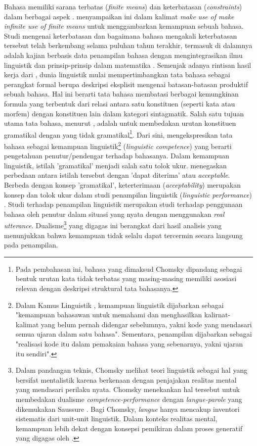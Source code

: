 Bahasa memiliki sarana terbatas (\textit{finite means}) dan keterbatasan (\textit{constraints}) dalam berbagai aspek \citep{von1972origin}. \cite{von1972origin} menyampaikan ini dalam kalimat \textit{make use of make infinite use of finite means} untuk menggambarkan kemampuan sebuah bahasa. Studi mengenai keterbatasan dan bagaimana bahasa mengakali keterbatasan tersebut telah berkembang selama puluhan tahun terakhir, termasuk di dalamnya adalah kajian berbasis data penampilan bahasa dengan mengintegrasikan ilmu linguistik dan prinsip-prinsip dalam matematika \citep{chomsky1965syntactic}. Semenjak adanya rintisan hasil kerja dari \cite{chomsky1957syntactic}, dunia linguistik mulai mempertimbangkan tata bahasa sebagai perangkat formal berupa deskripsi eksplisit mengenai batasan-batasan produktif sebuah bahasa. Hal ini berarti tata bahasa membatasi berbagai kemungkinan formula yang terbentuk dari relasi antara satu konstituen (seperti kata atau morfem) dengan konstituen lain dalam kategori sintagmatik. Salah satu tujuan utama tata bahasa, menurut \cite{chomsky1965syntactic}, adalah untuk membedakan urutan konstituen gramatikal dengan yang tidak gramatikal\footnote{Pada pembahasan ini, bahasa yang dimaksud Chomsky dipandang sebagai bentuk urutan kata tidak terbatas yang masing-masing memiliki asosiasi relevan dengan deskripsi struktural tata bahasanya.}. Dari sini, \cite{chomsky1965syntactic} mengekspresikan tata bahasa sebagai kemampuan linguistik\footnote{Dalam Kamus Linguistik \citep{kridalaksana2008kamus}, kemampuan linguistik dijabarkan sebagai "kemampuan bahasawan untuk memahami dan menghasilkan kalirnat-kalimat yang belum pernah didengar sebelumnya, yakni kode yang mendasari semua ujaran dalam satu bahasa". Sementara, penampilan dijabarkan sebagai "realisasi kode itu dalam pemakaian bahasa yang sebenarnya, yakni ujaran itu sendiri".} (\textit{linguistic competence}) yang berarti pengetahuan penutur/pendengar terhadap bahasanya. Dalam kemampuan linguistik, istilah 'gramatikal' menjadi salah satu tolok ukur.   \cite{chomsky1965syntactic} menegaskan perbedaan antara istilah tersebut dengan 'dapat diterima' atau \textit{acceptable}.  Berbeda dengan konsep 'gramatikal', keterterimaan (\textit{acceptability}) merupakan konsep dan tolok ukur dalam studi penampilan linguistik (\textit{linguistic performance}) \citep{chomsky1965syntactic}. Studi terhadap penampilan linguistik merupakan studi terhadap penggunaan bahasa oleh penutur dalam situasi yang nyata dengan menggunakan \textit{real utterance}. Dualisme\footnote{Dalam pandangan teknis, Chomsky melihat teori linguistik sebagai hal yang bersifat mentalistik karena berkenaan dengan penjajakan realitas mental yang mendasari perilaku nyata. Chomsky menekankan hal tersebut untuk membedakan dualisme \textit{competence-performance} dengan \textit{langue-parole} yang dikemukakan Saussure \citep{key2017course}. Bagi Chomsky, \textit{langue} hanya mencakup inventori sistematis dari unit-unit linguistik. Dalam konteks realitas mental, kemampuan lebih dekat dengan konsepsi pemikiran dalam proses generatif yang digagas oleh \cite{von1972origin}.} yang digagas  \cite{chomsky1965syntactic} ini berangkat dari hasil analisis yang menunjukkan bahwa kemampuan tidak selalu dapat tercermin secara langsung pada penampilan.


